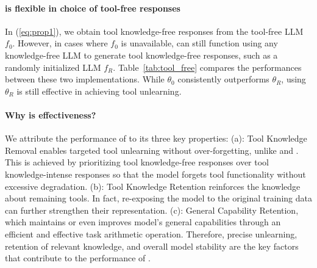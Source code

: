 \paragraph{\method is flexible in choice of tool-free responses}
In (\ref{eq:prop1}), we obtain tool knowledge-free responses from the tool-free LLM $f_0$. However, in cases where $f_0$ is unavailable, \method can still function using any knowledge-free LLM to generate tool knowledge-free responses, such as a randomly initialized LLM $f_R$. Table~\ref{tab:tool_free} compares the performances between these two implementations. While $\theta_0$ consistently outperforms $\theta_R$, using $\theta_R$ is still effective in achieving tool unlearning. 


\paragraph{Why is \method effectiveness?}
We attribute the performance of \method to its three key properties:
(a): Tool Knowledge Removal enables targeted tool unlearning without over-forgetting, unlike \GA and \RET. This is achieved by prioritizing tool knowledge-free responses over tool knowledge-intense responses so that the model forgets tool functionality without excessive degradation.
(b): Tool Knowledge Retention reinforces the knowledge about remaining tools. In fact, re-exposing the model to the original training data can further strengthen their representation. 
(c): General Capability Retention, which maintains or even improves model's general capabilities through an efficient and effective task arithmetic operation. Therefore, precise unlearning, retention of relevant knowledge, and overall model stability are the key factors that contribute to the performance of \method.  

 
